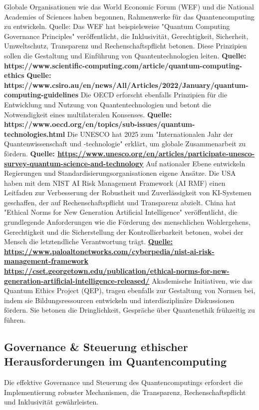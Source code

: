 {Globale Organisationen wie das World Economic Forum (WEF) und die National Academies of Sciences haben begonnen, Rahmenwerke für das Quantencomputing zu entwickeln. Quelle: Das WEF hat beispielsweise "Quantum Computing Governance Principles" veröffentlicht, die Inklusivität, Gerechtigkeit, Sicherheit, Umweltschutz, Transparenz und Rechenschaftspflicht betonen. Diese Prinzipien sollen die Gestaltung und Einführung von Quantentechnologien leiten. \textbf{Quelle: https://www.scientific-computing.com/article/quantum-computing-ethics} \textbf{Quelle: https://www.csiro.au/en/news/All/Articles/2022/January/quantum-computing-guidelines} Die OECD erforscht ebenfalls Prinzipien für die Entwicklung und Nutzung von Quantentechnologien und betont die Notwendigkeit eines multilateralen Konsenses. \textbf{Quelle: }\textbf{https://www.oecd.org/en/topics/sub-issues/quantum-technologies.html} Die UNESCO hat 2025 zum "Internationalen Jahr der Quantenwissenschaft und -technologie" erklärt, um globale Zusammenarbeit zu fördern. \textbf{Quelle: \href{https://www.unesco.org/en/articles/participate-unesco-survey-quantum-science-and-technology}{https://www.unesco.org/en/articles/participate-unesco-survey-quantum-science-and-technology}
}
Auf nationaler Ebene entwickeln Regierungen und Standardisierungsorganisationen eigene Ansätze. Die USA haben mit dem NIST AI Risk Management Framework (AI RMF) einen Leitfaden zur Verbesserung der Robustheit und Zuverlässigkeit von KI-Systemen geschaffen, der auf Rechenschaftspflicht und Transparenz abzielt. China hat "Ethical Norms for New Generation Artificial Intelligence" veröffentlicht, die grundlegende Anforderungen wie die Förderung des menschlichen Wohlergehens, Gerechtigkeit und die Sicherstellung der Kontrollierbarkeit betonen, wobei der Mensch die letztendliche Verantwortung trägt.\textbf{ \href{https://www.paloaltonetworks.com/cyberpedia/nist-ai-risk-management-framework}{Quelle:  https://www.paloaltonetworks.com/cyberpedia/nist-ai-risk-management-framework} \href{https://cset.georgetown.edu/publication/ethical-norms-for-new-generation-artificial-intelligence-released/}{https://cset.georgetown.edu/publication/ethical-norms-for-new-generation-artificial-intelligence-released/}
}
Akademische Initiativen, wie das Quantum Ethics Project (QEP), tragen ebenfalls zur Gestaltung von Normen bei, indem sie Bildungsressourcen entwickeln und interdisziplinäre Diskussionen fördern. Sie betonen die Dringlichkeit, Gespräche über Quantenethik frühzeitig zu führen. \cite{arrow_holistic_2023}


\subsection{Governance \& Steuerung ethischer Herausforderungen im Quantencomputing}
Die effektive Governance und Steuerung des Quantencomputings erfordert die Implementierung robuster Mechanismen, die Transparenz, Rechenschaftspflicht und Inklusivität gewährleisten.


}
